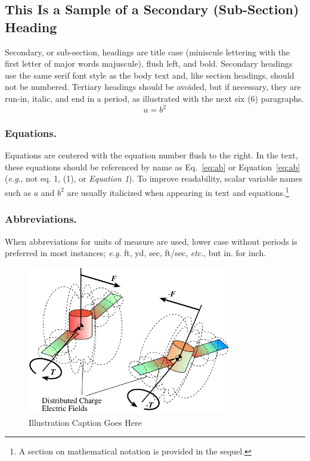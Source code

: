 \documentclass[letterpaper, preprint, paper,11pt]{AAS}	%
\begin{document}
\subsection{This Is a Sample of a Secondary (Sub-Section) Heading}
Secondary, or sub-section, headings are title case (miniscule lettering with the first letter of major words majuscule), flush left, and bold. Secondary headings use the same serif font style as the body text and, like section headings, should not be numbered. Tertiary headings should be avoided, but if necessary, they are run-in, italic, and end in a period, as illustrated with the next six (6) paragraphs.
\begin{equation}
	\label{eq:ab}
	a = b^{2}
\end{equation}

\subsubsection{Equations.} 
Equations are centered with the equation number flush to the right. In the text, these equations should be referenced by name as Eq.~\eqref{eq:ab} or Equation~\eqref{eq:ab} (\emph{e.g}., not eq. 1, (1), or \emph{Equation 1}). To improve readability, scalar variable names such as $a$ and $b^{2}$ are usually italicized when appearing in text and equations.\footnote{A section on mathematical notation is provided in the sequel.}



\subsubsection{Abbreviations.} 
When abbreviations for units of measure are used, lower case without periods is preferred in most instances; \emph{e.g}. ft, yd, sec, ft/sec, \emph{etc}., but in. for inch.




\begin{figure}[htb]
	\centering\includegraphics[width=3.5in]{Figures/test}
	\caption{Illustration Caption Goes Here}
	\label{fig:xxx}
\end{figure}
\end{document}
